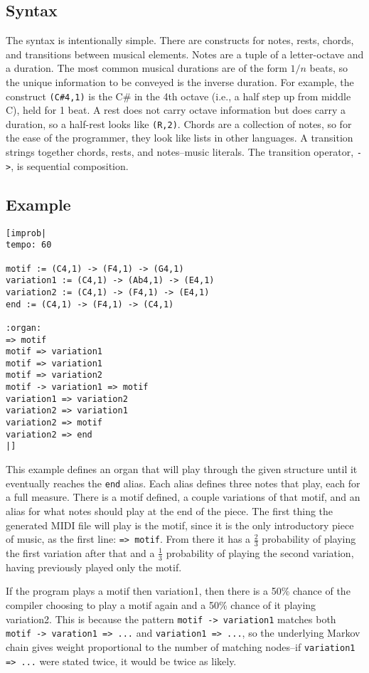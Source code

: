 \documentclass{sigplanconf-pldi15}
\begin{document}
\subsection{Syntax}
The syntax is intentionally simple. There are constructs for notes, rests, chords, and transitions between musical elements. Notes are a tuple of a letter-octave and a duration. The most common musical durations are of the form $1/n$ beats, so the unique information to be conveyed is the inverse duration. For example, the construct \texttt{(C\#4,1)} is the C\# in the 4th octave (i.e., a half step up from middle C), held for 1 beat.
A rest does not carry octave information but does carry a duration, so a half-rest looks like \texttt{(R,2)}.
Chords are a collection of notes, so for the ease of the programmer, they look like lists in other languages.
A transition strings together chords, rests, and notes--music literals. The transition operator, \texttt{->}, is sequential composition.

\subsection{Example}

\begin{verbatim}
[improb|
tempo: 60

motif := (C4,1) -> (F4,1) -> (G4,1)
variation1 := (C4,1) -> (Ab4,1) -> (E4,1)
variation2 := (C4,1) -> (F4,1) -> (E4,1)
end := (C4,1) -> (F4,1) -> (C4,1)

:organ:
=> motif
motif => variation1
motif => variation1
motif => variation2
motif -> variation1 => motif
variation1 => variation2
variation2 => variation1
variation2 => motif
variation2 => end
|]
\end{verbatim}
This example defines an organ that will play through the given structure until it eventually reaches the \texttt{end} alias. Each alias defines three notes that play, each for a full measure. There is a motif defined, a couple variations of that motif, and an alias for what notes should play at the end of the piece. The first thing the generated MIDI file will play is the motif, since it is the only introductory piece of music, as the first line: \texttt{=> motif}. From there it has a $\frac{2}{3}$ probability of playing the first variation after that and a $\frac{1}{3}$ probability of playing the second variation, having previously played only the motif.

If the program plays a motif then variation1, then there is a 50\% chance of the compiler choosing to play a motif again and a 50\% chance of it playing variation2. This is because the pattern \texttt{motif -> variation1} matches both \texttt{motif -> varation1 => ...} and \texttt{variation1 => ...}, so the underlying Markov chain gives weight proportional to the number of matching nodes--if \texttt{variation1 => ...} were stated twice, it would be twice as likely.
\end{document}
